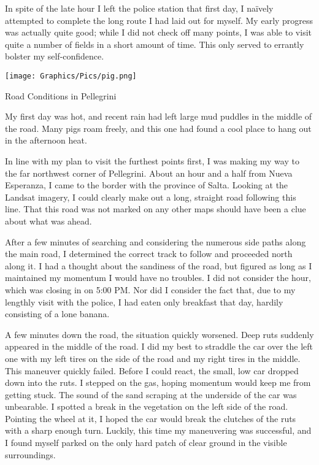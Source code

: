 In spite of the late hour I left the police station that first day, I naïvely attempted to complete the long route I had laid out for myself. My early progress was actually quite good; while I did not check off many points, I was able to visit quite a number of fields in a short amount of time. This only served to errantly bolster my self-confidence.

\begin{ssfigure}
  \centering
  \texttt{[image: Graphics/Pics/pig.png]}
  \caption{Road Conditions in Pellegrini}
  \label{pic:roadpig}
  \medskip
  \small
  My first day was hot, and recent rain had left large mud puddles in the middle of the road. Many pigs roam freely, and this one had found a cool place to hang out in the afternoon heat.
\end{ssfigure}

In line with my plan to visit the furthest points first, I was making my way to the far northwest corner of Pellegrini. About an hour and a half from Nueva Esperanza, I came to the border with the province of Salta. Looking at the Landsat imagery, I could clearly make out a long, straight road following this line. That this road was not marked on any other maps should have been a clue about what was ahead.

After a few minutes of searching and considering the numerous side paths along the main road, I determined the correct track to follow and proceeded north along it. I had a thought about the sandiness of the road, but figured as long as I maintained my momentum I would have no troubles. I did not consider the hour, which was closing in on 5:00 PM. Nor did I consider the fact that, due to my lengthly visit with the police, I had eaten only breakfast that day, hardily consisting of a lone banana.

A few minutes down the road, the situation quickly worsened. Deep ruts suddenly appeared in the middle of the road. I did my best to straddle the car over the left one with my left tires on the side of the road and my right tires in the middle. This maneuver quickly failed. Before I could react, the small, low car dropped down into the ruts. I stepped on the gas, hoping momentum would keep me from getting stuck. The sound of the sand scraping at the underside of the car was unbearable. I spotted a break in the vegetation on the left side of the road. Pointing the wheel at it, I hoped the car would break the clutches of the ruts with a sharp enough turn. Luckily, this time my maneuvering was successful, and I found myself parked on the only hard patch of clear ground in the visible surroundings.

